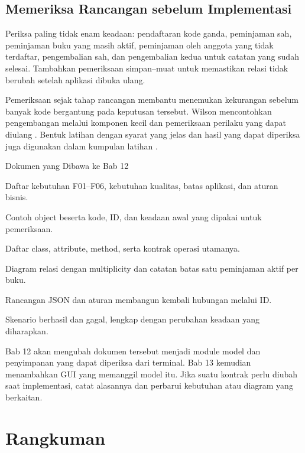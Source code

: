 \subsection{Memeriksa Rancangan sebelum Implementasi}

Periksa paling tidak enam keadaan: pendaftaran kode ganda, peminjaman sah, peminjaman buku yang masih aktif, peminjaman oleh anggota yang tidak terdaftar, pengembalian sah, dan pengembalian kedua untuk catatan yang sudah selesai. Tambahkan pemeriksaan simpan--muat untuk memastikan relasi tidak berubah setelah aplikasi dibuka ulang.

Pemeriksaan sejak tahap rancangan membantu menemukan kekurangan sebelum banyak kode bergantung pada keputusan tersebut. Wilson mencontohkan pengembangan melalui komponen kecil dan pemeriksaan perilaku yang dapat diulang \cite{wilson2024design}. Bentuk latihan dengan syarat yang jelas dan hasil yang dapat diperiksa juga digunakan dalam kumpulan latihan \cite{edcornerOopExercises}.

\begin{langkah}{Dokumen yang Dibawa ke Bab 12}
  \item Daftar kebutuhan F01--F06, kebutuhan kualitas, batas aplikasi, dan aturan bisnis.
  \item Contoh object beserta kode, ID, dan keadaan awal yang dipakai untuk pemeriksaan.
  \item Daftar class, attribute, method, serta kontrak operasi utamanya.
  \item Diagram relasi dengan multiplicity dan catatan batas satu peminjaman aktif per buku.
  \item Rancangan JSON dan aturan membangun kembali hubungan melalui ID.
  \item Skenario berhasil dan gagal, lengkap dengan perubahan keadaan yang diharapkan.
\end{langkah}

Bab 12 akan mengubah dokumen tersebut menjadi module model dan penyimpanan yang dapat diperiksa dari terminal. Bab 13 kemudian menambahkan GUI yang memanggil model itu. Jika suatu kontrak perlu diubah saat implementasi, catat alasannya dan perbarui kebutuhan atau diagram yang berkaitan.

\section{Rangkuman}

